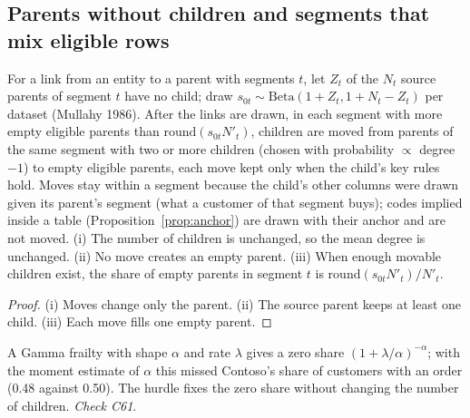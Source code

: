 \subsection{Parents without children and segments that mix eligible rows}
\begin{proposition}\label{prop:hurdle}
For a link from an entity to a parent with segments $t$, let $Z_t$ of the $N_t$ source parents of segment $t$ have no child; draw $s_{0t}\sim\mathrm{Beta}(1+Z_t,1+N_t-Z_t)$ per dataset (Mullahy 1986). After the links are drawn, in each segment with more empty eligible parents than $\mathrm{round}(s_{0t}N'_t)$, children are moved from parents of the same segment with two or more children (chosen with probability $\propto$ degree $-1$) to empty eligible parents, each move kept only when the child's key rules hold. Moves stay within a segment because the child's other columns were drawn given its parent's segment (what a customer of that segment buys); codes implied inside a table (Proposition~\ref{prop:anchor}) are drawn with their anchor and are not moved. (i) The number of children is unchanged, so the mean degree is unchanged. (ii) No move creates an empty parent. (iii) When enough movable children exist, the share of empty parents in segment $t$ is $\mathrm{round}(s_{0t}N'_t)/N'_t$.
\end{proposition}
\begin{proof}
(i) Moves change only the parent. (ii) The source parent keeps at least one child. (iii) Each move fills one empty parent.
\end{proof}
\noindent A Gamma frailty with shape $\alpha$ and rate $\lambda$ gives a zero share $(1+\lambda/\alpha)^{-\alpha}$; with the moment estimate of $\alpha$ this missed Contoso's share of customers with an order (0.48 against 0.50). The hurdle fixes the zero share without changing the number of children. \emph{Check C61}.

